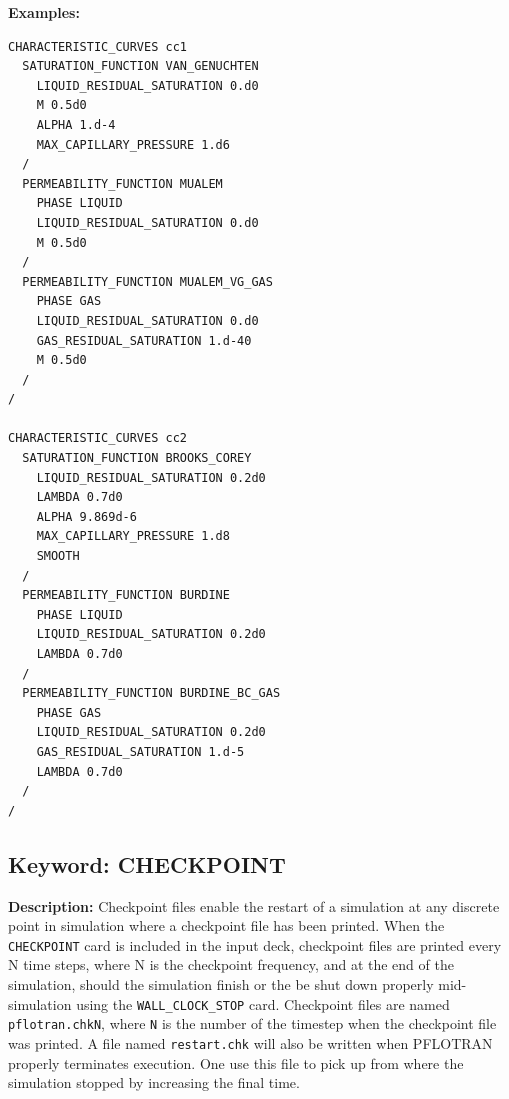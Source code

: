 \begin{mdframed}

{\bf Examples:}
\footnotesize

\begin{verbatim}
CHARACTERISTIC_CURVES cc1
  SATURATION_FUNCTION VAN_GENUCHTEN
    LIQUID_RESIDUAL_SATURATION 0.d0
    M 0.5d0
    ALPHA 1.d-4
    MAX_CAPILLARY_PRESSURE 1.d6
  /
  PERMEABILITY_FUNCTION MUALEM
    PHASE LIQUID
    LIQUID_RESIDUAL_SATURATION 0.d0
    M 0.5d0
  /
  PERMEABILITY_FUNCTION MUALEM_VG_GAS
    PHASE GAS
    LIQUID_RESIDUAL_SATURATION 0.d0
    GAS_RESIDUAL_SATURATION 1.d-40
    M 0.5d0
  /
/

CHARACTERISTIC_CURVES cc2
  SATURATION_FUNCTION BROOKS_COREY
    LIQUID_RESIDUAL_SATURATION 0.2d0
    LAMBDA 0.7d0
    ALPHA 9.869d-6
    MAX_CAPILLARY_PRESSURE 1.d8
    SMOOTH
  /
  PERMEABILITY_FUNCTION BURDINE
    PHASE LIQUID
    LIQUID_RESIDUAL_SATURATION 0.2d0
    LAMBDA 0.7d0
  /
  PERMEABILITY_FUNCTION BURDINE_BC_GAS
    PHASE GAS
    LIQUID_RESIDUAL_SATURATION 0.2d0
    GAS_RESIDUAL_SATURATION 1.d-5
    LAMBDA 0.7d0
  /
/
\end{verbatim}
\normalsize
\end{mdframed}

\hyperlink{target_key}{\return}


\newpage
\protect\hypertarget{target_ckpt}{}

\subsection{Keyword: CHECKPOINT}

\hfill\hyperlink{target_key}{\return}


{\noindent\bf Description:}
Checkpoint files enable the restart of a simulation at any discrete point in simulation where a checkpoint file has been printed.  When the {\tt CHECKPOINT} card is included in the input deck, checkpoint files are printed every N time steps, where N is the checkpoint frequency, and at the end of the simulation, should the simulation finish or the be shut down properly mid-simulation using the {\tt WALL\_CLOCK\_STOP} card.  Checkpoint files are named {\tt pflotran.chkN}, where {\tt N} is the number of the timestep when the checkpoint file was printed.
A file named {\tt restart.chk} will also be written when PFLOTRAN properly terminates execution. One use this file to pick up from where the simulation stopped by increasing the final time.

